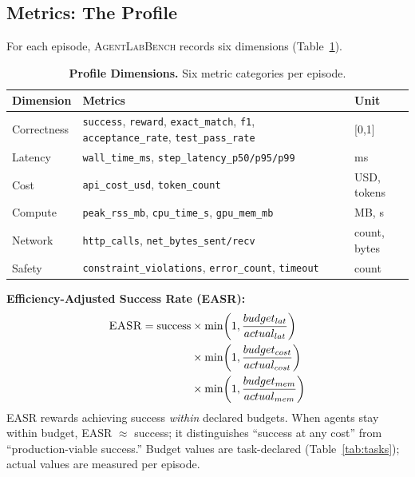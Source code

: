 \documentclass[letterpaper, 10 pt, conference]{ieeeconf}
\newcommand{\agentslabench}{\textsc{AgentLabBench}}
\newcommand{\easr}{\textsc{EASR}}
\begin{document}
\subsection{Metrics: The Profile}
\label{sec:metrics}

For each episode, \agentslabench{} records six dimensions (Table~\ref{tab:metrics}).

\begin{table}[t]
\centering
\caption{\textbf{Profile Dimensions.} Six metric categories per episode.}
\label{tab:metrics}
\footnotesize
\setlength{\tabcolsep}{3pt}
\begin{tabular}{lp{4.2cm}l}
\toprule
\textbf{Dimension} & \textbf{Metrics} & \textbf{Unit} \\
\midrule
Correctness & \texttt{success}, \texttt{reward}, \texttt{exact\_match}, \texttt{f1}, \texttt{acceptance\_rate}, \texttt{test\_pass\_rate} & [0,1] \\
Latency & \texttt{wall\_time\_ms}, \texttt{step\_latency\_p50/p95/p99} & ms \\
Cost & \texttt{api\_cost\_usd}, \texttt{token\_count} & USD, tokens \\
Compute & \texttt{peak\_rss\_mb}, \texttt{cpu\_time\_s}, \texttt{gpu\_mem\_mb} & MB, s \\
Network & \texttt{http\_calls}, \texttt{net\_bytes\_sent/recv} & count, bytes \\
Safety & \texttt{constraint\_violations}, \texttt{error\_count}, \texttt{timeout} & count \\
\bottomrule
\end{tabular}
\end{table}

\textbf{Efficiency-Adjusted Success Rate (\easr{}):}
\begin{equation}
\begin{aligned}
\text{\easr{}} = \text{success} &\times \min\!\left(1, \frac{budget_{lat}}{actual_{lat}}\right) \\
&\times \min\!\left(1, \frac{budget_{cost}}{actual_{cost}}\right) \\
&\times \min\!\left(1, \frac{budget_{mem}}{actual_{mem}}\right)
\end{aligned}
\label{eq:easr}
\end{equation}
\easr{} rewards achieving success \textit{within} declared budgets. When agents stay within budget, \easr{} $\approx$ success; it distinguishes ``success at any cost'' from ``production-viable success.'' Budget values are task-declared (Table~\ref{tab:tasks}); actual values are measured per episode.
\end{document}
